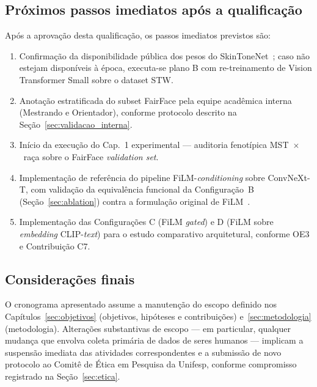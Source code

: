 \subsection{Próximos passos imediatos após a qualificação}
\label{sec:proximos}

Após a aprovação desta qualificação, os passos imediatos previstos são:

\begin{enumerate}
\item Confirmação da disponibilidade pública dos pesos do SkinToneNet~\cite{matias2026large}; caso não estejam disponíveis à época, executa-se plano B com re-treinamento de Vision Transformer Small sobre o dataset STW.
\item Anotação estratificada do subset FairFace pela equipe acadêmica interna (Mestrando e Orientador), conforme protocolo descrito na Seção~\ref{sec:validacao_interna}.
\item Início da execução do Cap.~1 experimental --- auditoria fenotípica MST~$\times$~raça sobre o FairFace \emph{validation set}.
\item Implementação de referência do pipeline FiLM-\emph{conditioning} sobre ConvNeXt-T, com validação da equivalência funcional da Configuração~B (Seção~\ref{sec:ablation}) contra a formulação original de FiLM~\cite{perez2018film}.
\item Implementação das Configurações C (FiLM \emph{gated}) e D (FiLM sobre \emph{embedding} CLIP-\emph{text}) para o estudo comparativo arquitetural, conforme OE3 e Contribuição C7.
\end{enumerate}

\subsection{Considerações finais}
\label{sec:cronograma_final}

O cronograma apresentado assume a manutenção do escopo definido nos Capítulos~\ref{sec:objetivos} (objetivos, hipóteses e contribuições) e~\ref{sec:metodologia} (metodologia). Alterações substantivas de escopo --- em particular, qualquer mudança que envolva coleta primária de dados de seres humanos --- implicam a suspensão imediata das atividades correspondentes e a submissão de novo protocolo ao Comitê de Ética em Pesquisa da Unifesp, conforme compromisso registrado na Seção~\ref{sec:etica}.
